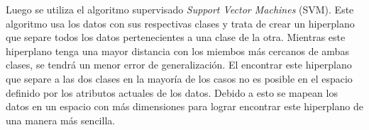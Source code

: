 Luego se utiliza el algoritmo supervisado {\it Support Vector Machines} (SVM). Este algoritmo usa los datos con sus respectivas clases y trata de crear un hiperplano que separe todos los datos pertenecientes a una clase de la otra. Mientras este hiperplano tenga una mayor distancia con los miembos más cercanos de ambas clases, se tendrá un menor error de generalización. El encontrar este hiperplano que separe a las dos clases en la mayoría de los casos no es posible en el espacio definido por los atributos actuales de los datos. Debido a esto se mapean los datos en un espacio con más dimensiones para lograr encontrar este hiperplano de una manera más sencilla.




